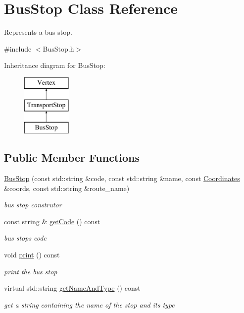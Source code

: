 \hypertarget{class_bus_stop}{}\section{Bus\+Stop Class Reference}
\label{class_bus_stop}


Represents a bus stop.  




{\ttfamily \#include $<$Bus\+Stop.\+h$>$}

Inheritance diagram for Bus\+Stop\+:\begin{figure}[H]
\begin{center}
\leavevmode
\includegraphics[height=3.000000cm]{class_bus_stop}
\end{center}
\end{figure}
\subsection*{Public Member Functions}
\begin{DoxyCompactItemize}
\item 
\hyperlink{class_bus_stop_ab48e6ec461fef340bb522e3569db716d}{Bus\+Stop} (const std\+::string \&code, const std\+::string \&name, const \hyperlink{class_coordinates}{Coordinates} \&coords, const std\+::string \&route\+\_\+name)
\begin{DoxyCompactList}\small\item\em bus stop construtor \end{DoxyCompactList}\item 
const string \& \hyperlink{class_bus_stop_a894b79e4e5582c9c89c3abc103c3a545}{get\+Code} () const 
\begin{DoxyCompactList}\small\item\em bus stop\textquotesingle{}s code \end{DoxyCompactList}\item 
\hypertarget{class_bus_stop_a8fa0c0a7f5252cd74a2e3337ef4e27e9}{}void \hyperlink{class_bus_stop_a8fa0c0a7f5252cd74a2e3337ef4e27e9}{print} () const \label{class_bus_stop_a8fa0c0a7f5252cd74a2e3337ef4e27e9}

\begin{DoxyCompactList}\small\item\em print the bus stop \end{DoxyCompactList}\item 
virtual std\+::string \hyperlink{class_bus_stop_a508c7cf008dcb6072ce4a5179cefd42d}{get\+Name\+And\+Type} () const 
\begin{DoxyCompactList}\small\item\em get a string containing the name of the stop and its type \end{DoxyCompactList}\end{DoxyCompactItemize}
